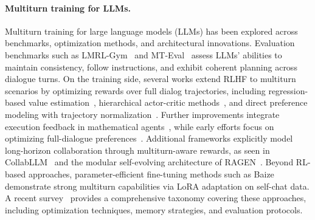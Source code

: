 \paragraph{Multiturn training for LLMs.}
Multiturn training for large language models (LLMs) has been explored across benchmarks, optimization methods, and architectural innovations. Evaluation benchmarks such as LMRL-Gym~\citep{abdulhai2023lmrlgym} and MT-Eval~\citep{kwan2024mteval} assess LLMs’ abilities to maintain consistency, follow instructions, and exhibit coherent planning across dialogue turns. On the training side, several works extend RLHF to multiturn scenarios by optimizing rewards over full dialog trajectories, including regression-based value estimation~\citep{gao2025refuel}, hierarchical actor-critic methods~\citep{archer}, and direct preference modeling with trajectory normalization~\citep{shi2024dmpo}. Further improvements integrate execution feedback in mathematical agents~\citep{xiong2024mathagent}, while early efforts focus on optimizing full-dialogue preferences~\citep{shani2024multiturn}. Additional frameworks explicitly model long-horizon collaboration through multiturn-aware rewards, as seen in CollabLLM~\citep{collabllm2025} and the modular self-evolving architecture of RAGEN~\citep{ragen}. Beyond RL-based approaches, parameter-efficient fine-tuning methods such as Baize~\citep{xu2023baize} demonstrate strong multiturn capabilities via LoRA adaptation on self-chat data. A recent survey~\citep{zhang2025survey} provides a comprehensive taxonomy covering these approaches, including optimization techniques, memory strategies, and evaluation protocols.






